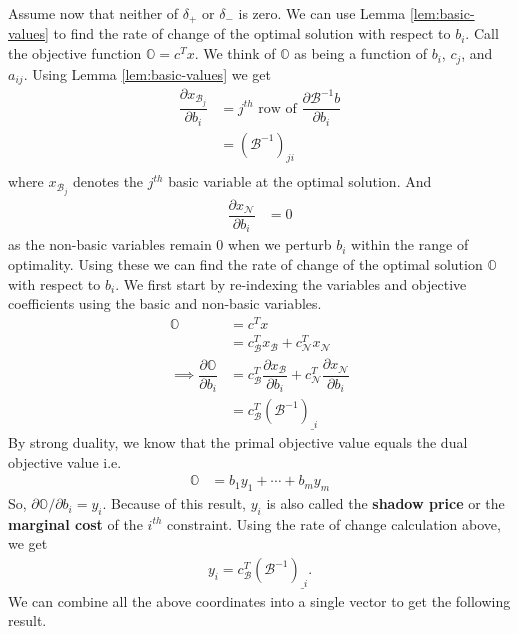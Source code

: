 \documentclass[
]{book}
\theoremstyle{definition}
\theoremstyle{definition}
\theoremstyle{definition}
\theoremstyle{definition}
\theoremstyle{remark}
\begin{document}
Assume now that neither of \(\delta_+\) or \(\delta_-\) is zero. We can use Lemma \ref{lem:basic-values} to find the rate of change of the optimal solution with respect to \(b_i\). Call the objective function \(\mathbb{O} = c^{T} x\). We think of \(\mathbb{O}\) as being a function of \(b_i\), \(c_j\), and \(a_{ij}.\) Using Lemma \ref{lem:basic-values} we get
\begin{align*}
  \dfrac{\partial x_{\mathcal{B}_j}}{\partial b_i} 
    &= j^{th} \mbox{ row of } \dfrac{\partial \mathcal{B}^{-1}b}{\partial b_i} \\
    &= (\mathcal{B}^{-1})_{ji} \\
\end{align*}
where \(x_{\mathcal{B}_j}\) denotes the \(j^{th}\) basic variable at the optimal solution. And
\begin{align*}
  \dfrac{\partial x_{\mathcal{N}}}{\partial b_i} 
    &= 0
\end{align*}
as the non-basic variables remain 0 when we perturb \(b_i\) within the range of optimality.
Using these we can find the rate of change of the optimal solution \(\mathbb{O}\) with respect to \(b_i\). We first start by re-indexing the variables and objective coefficients using the basic and non-basic variables.
\begin{align*}
  \mathbb{O} 
    &= c^T x \\
    &= c^T_{\mathcal{B}} x_{\mathcal{B}} + c^T_{\mathcal{N}} x_{\mathcal{N}} \\
\implies
  \dfrac{\partial \mathbb{O}}{\partial b_i} 
    &= c^T_{\mathcal{B}} \dfrac{\partial x_{\mathcal{B}}}{\partial b_i} + c^T_{\mathcal{N}} \dfrac{\partial x_{\mathcal{N}}}{\partial b_i} \\
    &= c^T_{\mathcal{B}} (\mathcal{B}^{-1})_{\_i}
\end{align*}
By strong duality, we know that the primal objective value equals the dual objective value i.e.~
\begin{align*}
 \mathbb{O} &= b_1 y_1 + \cdots + b_m y_m 
\end{align*}
So, \(\partial \mathbb{O}/\partial b_i = y_i\). Because of this result, \(y_i\) is also called the \textbf{shadow price} or the \textbf{marginal cost} of the \(i^{th}\) constraint.
Using the rate of change calculation above, we get \begin{align*}
  y_i = c^T_{\mathcal{B}} (\mathcal{B}^{-1})_{\_i}.
\end{align*}
We can combine all the above coordinates into a single vector to get the following result.
\end{document}
